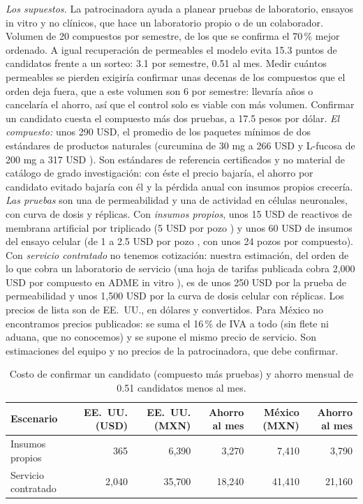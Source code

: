\documentclass[letterpaper,11pt]{article}
\begin{document}
\noindent\textit{Los supuestos.} La patrocinadora ayuda a planear pruebas de laboratorio, ensayos in vitro y no clínicos, que hace un laboratorio propio o de un colaborador. Volumen de 20 compuestos por semestre, de los que se confirma el 70\,\% mejor ordenado. A igual recuperación de permeables el modelo evita 15.3 puntos de candidatos frente a un sorteo: 3.1 por semestre, 0.51 al mes. Medir cuántos permeables se pierden exigiría confirmar unas decenas de los compuestos que el orden deja fuera, que a este volumen son 6 por semestre: llevaría años o cancelaría el ahorro, así que el control solo es viable con más volumen. Confirmar un candidato cuesta el compuesto más dos pruebas, a 17.5 pesos por dólar. \emph{El compuesto:} unos 290 USD, el promedio de los paquetes mínimos de dos estándares de productos naturales (curcumina de 30 mg a 266 USD \parencite{usp2026curcumina} y L-fucosa de 200 mg a 317 USD \parencite{usp2026fucosa}). Son estándares de referencia certificados y no material de catálogo de grado investigación: con éste el precio bajaría, el ahorro por candidato evitado bajaría con él y la pérdida anual con insumos propios crecería. \emph{Las pruebas} son una de permeabilidad y una de actividad en células neuronales, con curva de dosis y réplicas. Con \emph{insumos propios}, unos 15 USD de reactivos de membrana artificial por triplicado (5 USD por pozo \parencite{calibre2026pampa}) y unos 60 USD de insumos del ensayo celular (de 1 a 2.5 USD por pozo \parencite{osu2026htscore}, con unos 24 pozos por compuesto). Con \emph{servicio contratado} no tenemos cotización: nuestra estimación, del orden de lo que cobra un laboratorio de servicio (una hoja de tarifas publicada cobra 2,000 USD por compuesto en ADME in vitro \parencite{ttuhsc2025wtpc}), es de unos 250 USD por la prueba de permeabilidad y unos 1,500 USD por la curva de dosis celular con réplicas. Los precios de lista son de EE.~UU., en dólares y convertidos. Para México no encontramos precios publicados: se suma el 16\,\% de IVA a todo (sin flete ni aduana, que no conocemos) y se supone el mismo precio de servicio. Son estimaciones del equipo y no precios de la patrocinadora, que debe confirmar.

\begin{table}[h]
\centering
\caption{Costo de confirmar un candidato (compuesto más pruebas) y ahorro mensual de 0.51 candidatos menos al mes.}
\label{tab:escenarios}
\small
\begin{tabular}{lrrrrr}
\toprule
Escenario & EE.~UU. (USD) & EE.~UU. (MXN) & Ahorro al mes & México (MXN) & Ahorro al mes\\
\midrule
Insumos propios & 365 & 6,390 & 3,270 & 7,410 & 3,790\\
Servicio contratado & 2,040 & 35,700 & 18,240 & 41,410 & 21,160\\
\bottomrule
\end{tabular}
\end{table}
\end{document}
